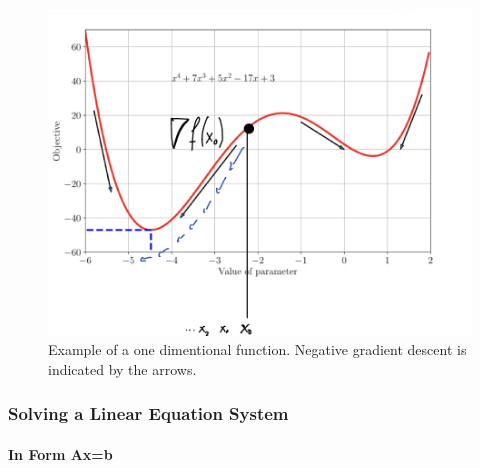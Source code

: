 \begin{figure}[H]
	\centering
	\includegraphics[scale = 0.2]{attachment/chapter_10/Scc052}
	\caption{Example of a one dimentional function. Negative gradient descent is indicated by the arrows.}
\end{figure}

\subsubsection{Solving a Linear Equation System}
\paragraph{In Form Ax=b}
